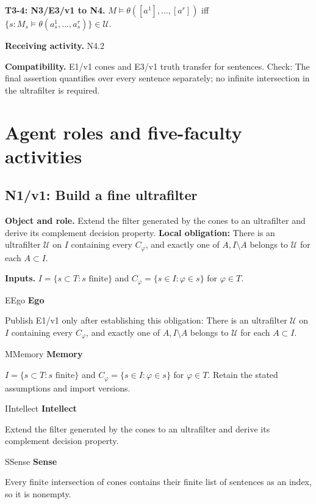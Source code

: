 \documentclass[preprint,12pt,aps,pra,showkeys,amsmath,amssymb,superscriptaddress,floatfix]{revtex4-2}
\theoremstyle{definition}
\theoremstyle{remark}
\newcommand{\mmfaculty}[3]{%
 \begin{mmfacultybox}{#1}{#2}
 {\sffamily\bfseries\color{MMBlue}#2}\par\smallskip #3
 \end{mmfacultybox}}
\newcommand{\field}[2]{\par\smallskip\noindent\textbf{#1.} #2\par}
\begin{document}
\field{T3-4: N3/E3/v1 to N4}{\(M\models\theta([a^1],\ldots,[a^r])\) iff
\(\{s:M_s\models\theta(a_s^1,\ldots,a_s^r)\}\in\mathcal U\).}

\field{Receiving activity}{N4.2}

\field{Compatibility}{E1/v1 cones and E3/v1 truth transfer for sentences. Check: The final
assertion quantifies over every sentence separately; no infinite
intersection in the ultrafilter is required.}

\endgroup

\clearpage\section{Agent roles and five-faculty activities}\begingroup\small\linespread{1.05}\selectfont{}

\begingroup\footnotesize\linespread{1.05}\selectfont\let\small\footnotesize

\subsection{N1/v1: Build a fine ultrafilter}

\field{Object and role}{Extend the filter generated by the cones to an ultrafilter and derive
its complement decision property. \textbf{Local obligation:} There is an
ultrafilter \(\mathcal U\) on \(I\) containing every \(C_\varphi\), and
exactly one of \(A,I\setminus A\) belongs to \(\mathcal U\) for each
\(A\subset I\).}

\field{Inputs}{\(I=\{s\subset T:s\text{ finite}\}\) and
\(C_\varphi=\{s\in I:\varphi\in s\}\) for \(\varphi\in T\).}

\mmfaculty{E}{Ego}{Publish E1/v1 only after establishing this obligation: There is an
ultrafilter \(\mathcal U\) on \(I\) containing every \(C_\varphi\), and
exactly one of \(A,I\setminus A\) belongs to \(\mathcal U\) for each
\(A\subset I\).}

\mmfaculty{M}{Memory}{\(I=\{s\subset T:s\text{ finite}\}\) and
\(C_\varphi=\{s\in I:\varphi\in s\}\) for \(\varphi\in T\). Retain the
stated assumptions and import versions.}

\mmfaculty{I}{Intellect}{Extend the filter generated by the cones to an ultrafilter and derive
its complement decision property.}

\mmfaculty{S}{Sense}{Every finite intersection of cones contains their finite list of
sentences as an index, so it is nonempty.}
\end{document}
